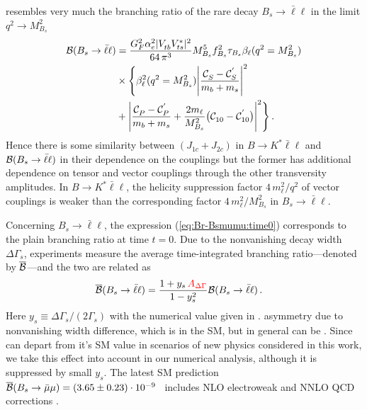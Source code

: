 \documentclass[twocolumn,epjc3]{svjour3}
\numberwithin{equation}{section}
\def \refeq#1{(\ref{#1})}
\newcommand{\christoph}[1]{{\color{red}{#1}}}
\newcommand{\wilson}[2][{}]{\mathcal{C}_{#2}^{\mathrm{#1}}}
\renewcommand{\[}{\big[}
\renewcommand{\]}{\big]}
\renewcommand{\(}{\big(}
\renewcommand{\)}{\big)}
\begin{document}
 resembles very much the branching ratio of the rare
decay $B_s \to \bar\ell\ell$ in the limit $q^2 \to M_{B_s}^2$
\begin{align}
\label{eq:Br-Bsmumu:time0}
  {\cal B}(B_s \to \bar\ell\ell) &=
    \frac{G_F^2 \alpha_e^2 |V_{tb}^{} V_{ts}^*|^2}{64\, \pi^3}
    M_{B_s}^5 f_{B_s}^2 \tau_{B_s} \beta_\ell(q^2 = M_{B_s}^2)
\nonumber\\
    & \times \Bigg\{
    \beta_\ell^2(q^2 = M_{B_s}^2) \Bigg|\frac{\wilson[]{S} - \wilson[']{S}}{m_b + m_s}\Bigg|^2 \nonumber\\
    &+ \Bigg|\frac{\wilson[]{P} - \wilson[']{P}}{m_b + m_s}
     + \frac{2 m_\ell}{M_{B_s}^2} \big(\wilson[]{10} - \wilson[']{10}\big) \Bigg|^2
    \Bigg\}\,.
  \end{align}
  Hence there is some similarity between $(J_{1c} + J_{2c})$ in $B \to K^*
  \bar\ell\ell$ and ${\cal B}(B_s \to \bar\ell\ell)$ in their dependence on the
  couplings but the former has additional dependence on tensor and vector
  couplings through the other transversity amplitudes.  In $B \to K^*
  \bar\ell\ell$, the helicity suppression factor $4\,m_\ell^2/q^2$ of vector
  couplings is weaker than the corresponding factor $4\,m_\ell^2/M_{B_s}^2$ in
  $B_s \to \bar\ell\ell$.

  Concerning $B_s\to \bar\ell\ell$, the expression \refeq{eq:Br-Bsmumu:time0}
  corresponds to the plain branching ratio at time $t=0$. Due to the
  nonvanishing decay width $\Delta\Gamma_s$, experiments measure the average
  time-integrated branching ratio---denoted by $\overline{\cal B}$---and the two
  are related as \cite{DeBruyn:2012wk}
\begin{align}
  \label{eq:Br-Bsmumu}
  \overline{\cal B} (B_s \to \bar\ell\ell) &
  = \frac{1 + y_s \christoph{\, A_{\Delta\Gamma}}}{1 - y_s^2} {\cal B} (B_s \to \bar\ell\ell)\,.
\end{align}
Here $y_s \equiv \Delta\Gamma_s/(2\Gamma_s)$ with the numerical value given in
\cite{Beaujean:2013soa}. \christoph{$A_{\Delta\Gamma}$ is the mass-eigenstate rate} asymmetry
due to nonvanishing width difference, which is \christoph{$A_{\Delta\Gamma} = 1$}
in the SM, but in general can be \christoph{$A_{\Delta\Gamma} \in [-1,\, 1]$}.
Since \christoph{$A_{\Delta\Gamma}$} can depart from it's SM value in scenarios of
new physics considered in this work, we take this effect into account
in our numerical analysis, although it is suppressed by small $y_s$. The latest
SM prediction $\overline{\cal B} (B_s \to \bar\mu\mu) = (3.65 \pm 0.23) \cdot
10^{-9}$~\cite{Bobeth:2013uxa} includes NLO electroweak \cite{Bobeth:2013tba}
and NNLO QCD corrections \cite{Hermann:2013kca}.
\end{document}

